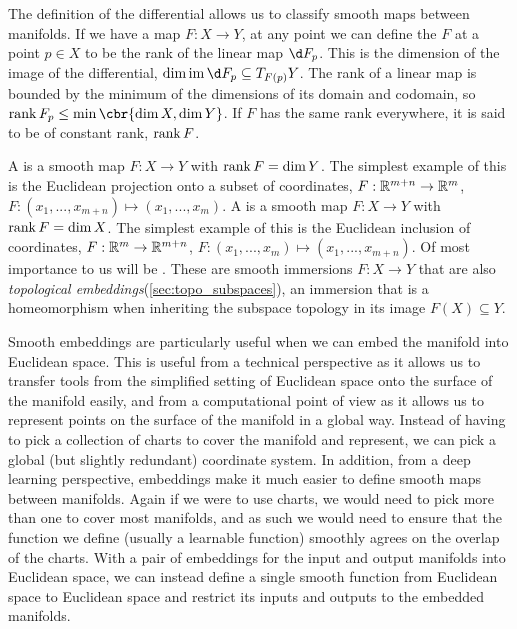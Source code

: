 The definition of the differential allows us to classify smooth maps between manifolds.
If we have a map \(F: X\to Y\), at any point we can define the  \(F\) at a point \(p\in X\) to be the rank of the linear map \(\d F_p\).
This is the dimension of the image of the differential, \(\dim \im \d F_p \subseteq T_{F(p)}Y\).
The rank of a linear map is bounded by the minimum of the dimensions of its domain and codomain, so \(\rank F_p \leq \min \cbr{\dim X, \dim Y}\).
If \(F\) has the same rank everywhere, it is said to be of constant rank, \(\operatorname{rank} F\).

A  is a smooth map \(F:X\to Y\) with \(\operatorname{rank} F = \dim Y\).
The simplest example of this is the Euclidean projection onto a subset of coordinates, \(F:\mathbb{R}^{m+n} \to \mathbb{R}^m\), \(F: (x_1, ..., x_{m+n}) \mapsto (x_1, ..., x_m)\).
A  is a smooth map \(F:X\to Y\) with \(\operatorname{rank} F = \dim X\).
The simplest example of this is the Euclidean inclusion of coordinates, \(F:\mathbb{R}^{m} \to \mathbb{R}^{m+n}\), \(F: (x_1, ..., x_m) \mapsto (x_1, ..., x_{m+n})\).
Of most importance to us will be .
These are smooth immersions \(F:X \to Y\) that are also \emph{topological embeddings}(\cref{sec:topo_subspaces}), an immersion that is a homeomorphism when inheriting the subspace topology in its image \(F(X) \subseteq Y\).

Smooth embeddings are particularly useful when we can embed the manifold into Euclidean space.
This is useful from a technical perspective as it allows us to transfer tools from the simplified setting of Euclidean space onto the surface of the manifold easily, and from a computational point of view as it allows us to represent points on the surface of the manifold in a global way.
Instead of having to pick a collection of charts to cover the manifold and represent, we can pick a global (but slightly redundant) coordinate system.
In addition, from a deep learning perspective, embeddings make it much easier to define smooth maps between manifolds.
Again if we were to use charts, we would need to pick more than one to cover most manifolds, and as such we would need to ensure that the function we define (usually a learnable function) smoothly agrees on the overlap of the charts.
With a pair of embeddings for the input and output manifolds into Euclidean space, we can instead define a single smooth function from Euclidean space to Euclidean space and restrict its inputs and outputs to the embedded manifolds.

